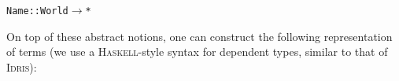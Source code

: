 \documentclass[9pt,preprint,authoryear]{sigplanconf}
\begin{document}
{{{}\vphantom{$\{$}}}\textcolor[rgb]{0,0,0.80}{\texttt{Name}}\textcolor[rgb]{0,0,0.80}{\texttt{\mbox{\hspace{0.50em}}}}\textcolor[cmyk]{0,0.65,0.99,0}{\texttt{{:}{:}}}\textcolor[rgb]{0,0,0.80}{\texttt{\mbox{\hspace{0.50em}}}}\textcolor[rgb]{0,0,0.80}{\texttt{World}}\textcolor[rgb]{0,0,0.80}{\texttt{\mbox{\hspace{0.50em}}}}\textcolor[cmyk]{0,0.65,0.99,0}{\texttt{$ \rightarrow $}}\textcolor[rgb]{0,0,0.80}{\texttt{\mbox{\hspace{0.50em}}}}\textcolor[rgb]{0,0,0.80}{\texttt{*}}\textcolor[rgb]{0,0,0.80}{\texttt{{\nopagebreak \newline%
}\vphantom{$\{$}}}%


%
%


%
  On top of these abstract notions, one can construct the following representation of terms (we use
  a \textsc{Haskell}-style syntax for dependent types, similar to that of \textsc{Idris}){:}


%
%


{\nopagebreak }
\end{document}
